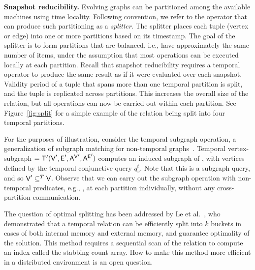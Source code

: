 {\bf Snapshot reducibility.}  Evolving graphs can be partitioned among
the available machines using time locality.  Following convention, we
refer to the operator that can produce such partitioning as a {\em
  splitter}.  The splitter places each tuple (vertex or edge) into one
or more partitions based on its timestamp.  The goal of the splitter
is to form partitions that are balanced, i.e., have approximately the
same number of items, under the assumption that most operations can be
executed locally at each partition.  Recall that snapshot reducibility
requires a temporal operator to produce the same result as if it were
evaluated over each snapshot.  Validity period of a tuple that spans
more than one temporal partition is split, and the tuple is replicated
across partitions.  This increases the overall size of the relation,
but all operations can now be carried out within each partition.  See
Figure~\ref{fig:split} for a simple example of the  relation
being split into four temporal partitions.

For the purposes of illustration, consider the temporal subgraph
operation, a generalization of subgraph matching for non-temporal
graphs~\cite{PortalarXiv2016}.  Temporal vertex-subgraph
 $=\mathsf{T}'(\textsf{V}', \textsf{E}', \mathsf{A^{V}}', \mathsf{A^{E}}')$ computes an
induced subgraph of \tve, with vertices defined by the temporal
conjunctive query $q^t_v$.  Note that this is a subgraph query, and so
$\textsf{V}' \subseteq^T \textsf{V}$.  Observe that we can carry out the subgraph
operation with non-temporal predicates, e.g., , at
each partition individually, without any cross-partition
communication.

The question of optimal splitting has been addressed by Le et
al.~\cite{Le2013}, who demonstrated that a temporal relation can be
efficiently split into $k$ buckets in cases of both internal memory
and external memory, and guarantee optimality of the solution.  This method requires a sequential scan of the
relation to compute an index called the stabbing count array.  How to
make this method more efficient in a distributed environment is an
open question.


